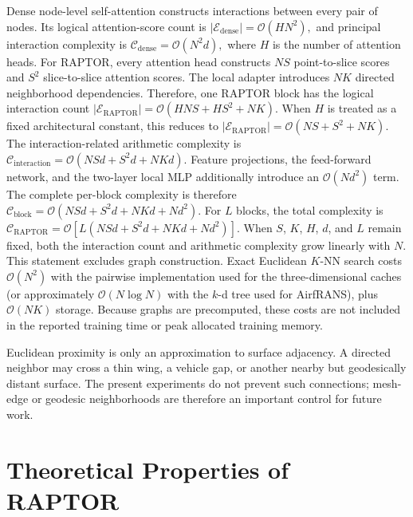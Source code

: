 \documentclass[a4paper,fleqn]{cas-sc}
\begin{document}
Dense node-level self-attention constructs interactions between every pair of nodes. Its logical attention-score count is $|\mathcal E_{\mathrm{dense}}| = \mathcal O(HN^2),$ and principal interaction complexity is $\mathcal C_{\mathrm{dense}}
    =
    \mathcal O(N^2d),$
where \(H\) is the number of attention heads.
For RAPTOR, every attention head constructs \(NS\) point-to-slice scores and \(S^2\) slice-to-slice attention scores. The local adapter introduces \(NK\) directed neighborhood dependencies. Therefore, one RAPTOR block
has the logical interaction count $|\mathcal E_{\mathrm{RAPTOR}}| = \mathcal O \left( HNS+HS^2+NK \right).$
When \(H\) is treated as a fixed architectural constant, this reduces to $|\mathcal E_{\mathrm{RAPTOR}}|
    =
    \mathcal O
    \left(
        NS+S^2+NK
    \right).$
The interaction-related arithmetic complexity is $ \mathcal C_{\mathrm{interaction}}
    =
    \mathcal O
    \left(
        NSd+S^2d+NKd
    \right).$
Feature projections, the feed-forward network, and the two-layer local MLP additionally introduce an \(\mathcal O(Nd^2)\) term. The complete per-block complexity is therefore $\mathcal C_{\mathrm{block}}
    =
    \mathcal O
    \left(
        NSd+S^2d+NKd+Nd^2
    \right).$
For \(L\) blocks, the total complexity is $ \mathcal C_{\mathrm{RAPTOR}}
    =
    \mathcal O
    \left[
        L
        \left(
            NSd+S^2d+NKd+Nd^2
        \right)
    \right].$
When \(S\), \(K\), \(H\), \(d\), and \(L\) remain fixed, both the interaction count and arithmetic complexity grow linearly with \(N\). This statement excludes graph construction. Exact Euclidean \(K\)-NN search costs \(\mathcal{O}(N^2)\) with the pairwise implementation used for the three-dimensional caches (or approximately \(\mathcal{O}(N\log N)\) with the \(k\)-d tree used for AirfRANS), plus \(\mathcal{O}(NK)\) storage. Because graphs are precomputed, these costs are not included in the reported training time or peak allocated training memory.

Euclidean proximity is only an approximation to surface adjacency. A directed neighbor may cross a thin wing, a vehicle gap, or another nearby but geodesically distant surface. The present experiments do not prevent such connections; mesh-edge or geodesic neighborhoods are therefore an important control for future work.

\section{Theoretical Properties of RAPTOR}
\label{sec:theory}
\end{document}
